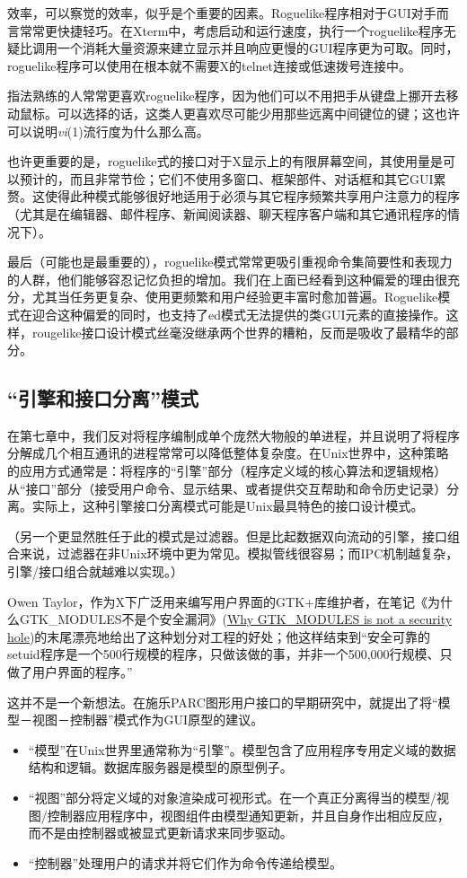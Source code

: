 \documentclass[12pt,oneside]{book}
\begin{document}
效率，可以察觉的效率，似乎是个重要的因素。Roguelike程序相对于GUI对手而言常常更快捷轻巧。在Xterm中，考虑启动和运行速度，执行一个roguelike程序无疑比调用一个消耗大量资源来建立显示并且响应更慢的GUI程序更为可取。同时，roguelike程序可以使用在根本就不需要X的telnet连接或低速拨号连接中。

指法熟练的人常常更喜欢roguelike程序，因为他们可以不用把手从键盘上挪开去移动鼠标。可以选择的话，这类人更喜欢尽可能少用那些远离中间键位的键；这也许可以说明\textit{vi}(1)流行度为什么那么高。

也许更重要的是，roguelike式的接口对于X显示上的有限屏幕空间，其使用量是可以预计的，而且非常节俭；它们不使用多窗口、框架部件、对话框和其它GUI累赘。这使得此种模式能够很好地适用于必须与其它程序频繁共享用户注意力的程序（尤其是在编辑器、邮件程序、新闻阅读器、聊天程序客户端和其它通讯程序的情况下）。

最后（可能也是最重要的），roguelike模式常常更吸引重视命令集简要性和表现力的人群，他们能够容忍记忆负担的增加。我们在上面已经看到这种偏爱的理由很充分，尤其当任务更复杂、使用更频繁和用户经验更丰富时愈加普遍。Roguelike模式在迎合这种偏爱的同时，也支持了ed模式无法提供的类GUI元素的直接操作。这样，rougelike接口设计模式丝毫没继承两个世界的糟粕，反而是吸收了最精华的部分。

\subsection{“引擎和接口分离”模式}
在第七章中，我们反对将程序编制成单个庞然大物般的单进程，并且说明了将程序分解成几个相互通讯的进程常常可以降低整体复杂度。在Unix世界中，这种策略的应用方式通常是：将程序的“引擎”部分（程序定义域的核心算法和逻辑规格）从“接口”部分（接受用户命令、显示结果、或者提供交互帮助和命令历史记录）分离。实际上，这种引擎接口分离模式可能是Unix最具特色的接口设计模式。

（另一个更显然胜任于此的模式是过滤器。但是比起数据双向流动的引擎，接口组合来说，过滤器在非Unix环境中更为常见。模拟管线很容易；而IPC机制越复杂，引擎/接口组合就越难以实现。）

Owen Taylor，作为X下广泛用来编写用户界面的GTK+库维护者，在笔记《为什么GTK\_{}MODULES不是个安全漏洞》(\href{http://www.gtk.org/setuid.html}{Why GTK\_{}MODULES is not a security hole})的末尾漂亮地给出了这种划分对工程的好处；他这样结束到“安全可靠的setuid程序是一个500行规模的程序，只做该做的事，并非一个500,000行规模、只做了用户界面的程序。”

这并不是一个新想法。在施乐PARC图形用户接口的早期研究中，就提出了将“模型－视图－控制器”模式作为GUI原型的建议。
\begin{itemize}
\item “模型”在Unix世界里通常称为“引擎”。模型包含了应用程序专用定义域的数据结构和逻辑。数据库服务器是模型的原型例子。
\item “视图”部分将定义域的对象渲染成可视形式。在一个真正分离得当的模型/视图/控制器应用程序中，视图组件由模型通知更新，并且自身作出相应反应，而不是由控制器或被显式更新请求来同步驱动。
\item “控制器”处理用户的请求并将它们作为命令传递给模型。
\end{itemize}
\end{document}

